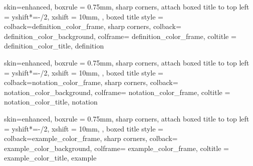 {
  skin=enhanced,
  boxrule = 0.75mm,
  sharp corners,
  attach boxed title to top left = {
      yshift*=-\tcboxedtitleheight/2,
      xshift = 10mm,
    },
  boxed title style = {colback=definition_color_frame, sharp corners},
  colback= definition_color_background,
  colframe= definition_color_frame,
  coltitle = definition_color_title,
}{definition}

{
  skin=enhanced,
  boxrule = 0.75mm,
  sharp corners,
  attach boxed title to top left = {
      yshift*=-\tcboxedtitleheight/2,
      xshift = 10mm,
    },
  boxed title style = {colback=notation_color_frame, sharp corners},
  colback= notation_color_background,
  colframe= notation_color_frame,
  coltitle = notation_color_title,
}{notation}

{
  skin=enhanced,
  boxrule = 0.75mm,
  sharp corners,
  attach boxed title to top left = {
      yshift*=-\tcboxedtitleheight/2,
      xshift = 10mm,
    },
  boxed title style = {colback=example_color_frame, sharp corners},
  colback= example_color_background,
  colframe= example_color_frame,
  coltitle = example_color_title,
}{example}

